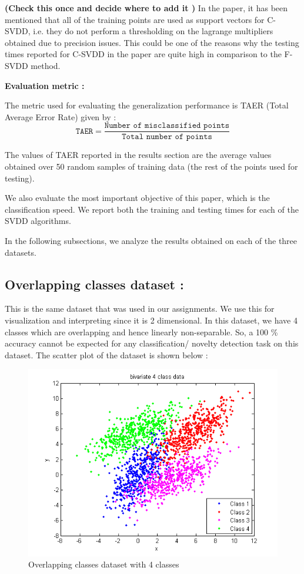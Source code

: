 \documentclass{article} %
\begin{document}
\textbf{(Check this once and decide where to add it )}
In the paper, it has been mentioned that all of the training points are used as support vectors for C-SVDD, i.e. they do not perform a thresholding on the lagrange multipliers obtained due to precision issues. This could be one of the reasons why the testing times reported for C-SVDD in the paper are quite high in comparison to the F-SVDD method.



\textbf{Evaluation metric :}

The metric used for evaluating the generalization performance is  TAER (Total Average Error Rate) given by :
\[ \texttt{TAER} = \frac{\texttt{Number of misclassified points}}{\texttt{Total number of points}} \]

The values of TAER reported in the results section are the average values obtained over 50 random samples of training data (the rest of the points used for testing). 

We also evaluate the most important objective of this paper, which is the classification speed. We report both the training and testing times for each of the SVDD algorithms.

In the following subsections, we analyze the results obtained on each of the three datasets. \\[10pt]



\subsection{Overlapping classes dataset :} This is the same dataset that was used in our assignments. We use this for visualization and interpreting since it is 2 dimensional. In this dataset, we have 4 classes which are overlapping and hence linearly non-separable. So, a 100 \% accuracy cannot be expected for any classification/ novelty detection task on this dataset.
The scatter plot of the dataset is shown below :

\begin{figure}
  \centering
  \includegraphics[width=\linewidth]{../Code/overlapping/svdd/data}
  \caption{Overlapping classes dataset with 4 classes}
\end{figure}
\end{document}
